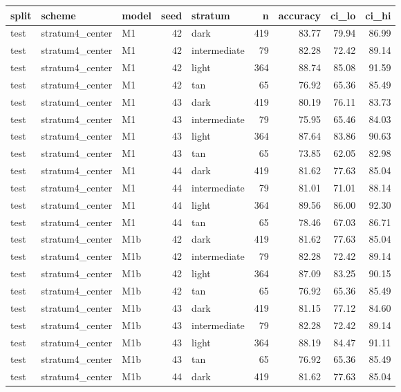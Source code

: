 \begin{tabular}{lllrlrrrr}
\toprule
split & scheme & model & seed & stratum & n & accuracy & ci\_lo & ci\_hi \\
\midrule
test & stratum4\_center & M1 & 42 & dark & 419 & 83.77 & 79.94 & 86.99 \\
test & stratum4\_center & M1 & 42 & intermediate & 79 & 82.28 & 72.42 & 89.14 \\
test & stratum4\_center & M1 & 42 & light & 364 & 88.74 & 85.08 & 91.59 \\
test & stratum4\_center & M1 & 42 & tan & 65 & 76.92 & 65.36 & 85.49 \\
test & stratum4\_center & M1 & 43 & dark & 419 & 80.19 & 76.11 & 83.73 \\
test & stratum4\_center & M1 & 43 & intermediate & 79 & 75.95 & 65.46 & 84.03 \\
test & stratum4\_center & M1 & 43 & light & 364 & 87.64 & 83.86 & 90.63 \\
test & stratum4\_center & M1 & 43 & tan & 65 & 73.85 & 62.05 & 82.98 \\
test & stratum4\_center & M1 & 44 & dark & 419 & 81.62 & 77.63 & 85.04 \\
test & stratum4\_center & M1 & 44 & intermediate & 79 & 81.01 & 71.01 & 88.14 \\
test & stratum4\_center & M1 & 44 & light & 364 & 89.56 & 86.00 & 92.30 \\
test & stratum4\_center & M1 & 44 & tan & 65 & 78.46 & 67.03 & 86.71 \\
test & stratum4\_center & M1b & 42 & dark & 419 & 81.62 & 77.63 & 85.04 \\
test & stratum4\_center & M1b & 42 & intermediate & 79 & 82.28 & 72.42 & 89.14 \\
test & stratum4\_center & M1b & 42 & light & 364 & 87.09 & 83.25 & 90.15 \\
test & stratum4\_center & M1b & 42 & tan & 65 & 76.92 & 65.36 & 85.49 \\
test & stratum4\_center & M1b & 43 & dark & 419 & 81.15 & 77.12 & 84.60 \\
test & stratum4\_center & M1b & 43 & intermediate & 79 & 82.28 & 72.42 & 89.14 \\
test & stratum4\_center & M1b & 43 & light & 364 & 88.19 & 84.47 & 91.11 \\
test & stratum4\_center & M1b & 43 & tan & 65 & 76.92 & 65.36 & 85.49 \\
test & stratum4\_center & M1b & 44 & dark & 419 & 81.62 & 77.63 & 85.04 \\

\end{tabular}
